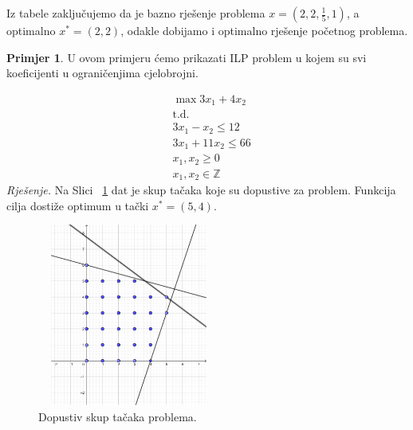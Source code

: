 \documentclass[b5paper, utf8, 11pt, colorlinks]{book}
\theoremstyle{definition}
\newtheorem{primjer}{Primjer}[chapter]
\begin{document}
Iz tabele zaključujemo da je bazno rješenje problema 
$x=(2,2, \frac{1}{5}, 1)$, a optimalno $x^* = (2, 2)$, odakle dobijamo i optimalno rješenje početnog problema. 


\begin{primjer}  U ovom primjeru ćemo prikazati ILP problem u kojem su svi koeficijenti u ograničenjima cjelobrojni.
	\end{primjer}
\begin{align*}
    &\max 3 x_1 + 4 x_2 \\
    &\mbox{t.d.} \\
    & 3 x_1 - x_2 \leq 12 \\
    & 3 x_1 + 11 x_2 \leq 66 \\
    & x_1, x_2 \geq 0 \\
    & x_1, x_2 \in \mathbb{Z}
\end{align*}
\emph{Rješenje. }
 Na Slici~ \ref{fig:region_ilp_primjer_2} dat je skup tačaka koje su dopustive za problem. Funkcija cilja dostiže optimum u tački $x^*=(5,4)$.
 \begin{figure}
    \centering
    \includegraphics[width=170pt,height=170pt]{region_ilp_primjer_2.eps}
    \caption{Dopustiv skup tačaka problema.}
    \label{fig:region_ilp_primjer_2}
\end{figure}
\end{document}

